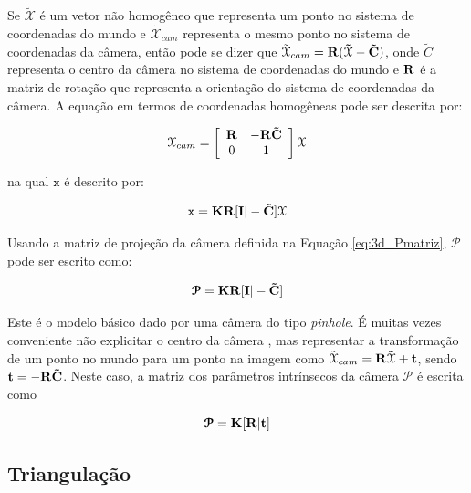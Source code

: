 {Se $\tilde{\mathcal{X}}$ é um vetor não homogêneo que representa um ponto no
sistema de coordenadas do mundo e $\tilde{\mathcal{X}}_{cam}$ representa o mesmo
ponto no sistema de coordenadas da câmera, então pode se dizer que
$\tilde{\mathcal{X}}_{cam} = \bf{R}(\tilde{\mathcal{X}} - \tilde{C})$, onde
$\tilde{C}$ representa o centro da câmera no sistema de coordenadas do mundo e
$\bf{R}$ é a matriz de rotação que representa a orientação do sistema de
coordenadas da câmera. A equação em termos de coordenadas homogêneas pode ser
descrita por:

\begin{align}
\mathcal{X}_{cam} =
\left[\begin{array}{cc}
\bf{R} &  -\bf{R}\tilde{C}\\
0 & 1
\end{array}\right]
\mathcal{X}
\label{eq:3d_matRot}
\end{align}

na qual $\mathtt{x}$ é descrito por:

\begin{equation}
\mathtt{x} = \bf{K}\bf{R}[\bf{I}|-\tilde{C}]\mathcal{X}
\label{eq:3d_camModel2}
\end{equation}

Usando a matriz de projeção da câmera definida na Equação \ref{eq:3d_Pmatriz},
$\bm{\mathcal{P}}$ pode ser escrito como:

\begin{equation}
\bm{\mathcal{P}} = \bf{K}\bf{R}[\bf{I}|-\tilde{C}]
\label{eq:3d_PModel1}
\end{equation}


Este é o modelo básico dado por uma câmera do tipo \textit{pinhole}. É muitas
vezes conveniente não explicitar o centro da câmera \cite{hartley2003multiple},
mas representar a transformação de um ponto no mundo para um ponto na imagem
como $\tilde{\mathcal{X}}_{cam} = \bf{R}\tilde{\mathcal{X}} + \bf{t}$, sendo
$\bf{t} =-\bf{R}\tilde{C}$. Neste caso, a matriz dos parâmetros intrínsecos da
câmera $\bm{\mathcal{P}}$  é escrita como

\begin{equation}
\bm{\mathcal{P}} = \bf{K}[\bf{R}|\bf{t}]
\label{eq:3d_PModel2}
\end{equation}

\subsection{Triangulação}

}
